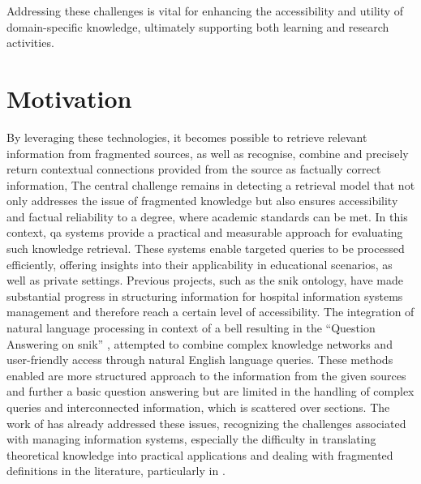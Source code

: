Addressing these challenges is vital for enhancing the accessibility and utility of domain-specific knowledge, ultimately supporting both learning and research activities. 

\section{Motivation}\label{motivation}
By leveraging these technologies, it becomes possible to retrieve relevant information from fragmented sources, as well as recognise, combine and precisely return contextual connections provided from the source as factually correct information, 
The central challenge remains in detecting a retrieval model that not only addresses the issue of fragmented knowledge but also ensures accessibility and factual reliability to a degree, where academic standards can be met. 
In this context, \ac{qa} systems provide a practical and measurable approach for evaluating such knowledge retrieval. 
These systems enable targeted queries to be processed efficiently, offering insights into their applicability in educational scenarios, as well as private settings.
% 
Previous projects, such as the \ac{snik} ontology, have made substantial progress in structuring information for hospital information systems management and therefore reach a certain level of accessibility. 
The integration of natural language processing in context of a \ac{bell} resulting in the \enquote{Question Answering on \ac{snik}} \citep{hannesbell, hannesbell_skill}, attempted to combine complex knowledge networks and user-friendly access through natural English language queries. 
These methods enabled are more structured approach to the information from the given sources and further a basic question answering but are limited in the handling of complex queries and interconnected information, which is scattered over sections.
The work of \citet{Paul_Keller} has already addressed these issues, recognizing the challenges associated with managing information systems, especially the difficulty in translating theoretical knowledge into practical applications and dealing with fragmented definitions in the literature, particularly in \citet{bb2}. 
